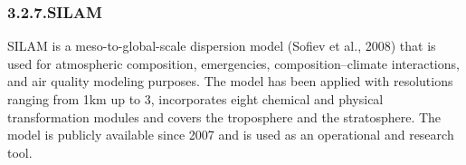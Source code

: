 \documentclass[9pt]{report}
\begin{document}
\begin{table}[h!]%
\begin{mdcenter}%
{}%
\end{mdcenter}\label{mocage-portfolio}%
\end{table}%

\subsubsection{3.2.7.\hspace*{0.5em}SILAM}\label{sec-silam}%

\noindent{}SILAM is a meso-to-global-scale dispersion model (Sofiev et al., 2008) that is used for atmospheric composition, emergencies, composition–climate interactions, and air quality modeling purposes. 
The model has been applied with resolutions ranging from 1km up to 3\textdegree{}, incorporates eight chemical and physical transformation modules and covers the troposphere and the stratosphere. 
The model is publicly available since 2007 and is used as an operational and research tool.%
\end{document}
